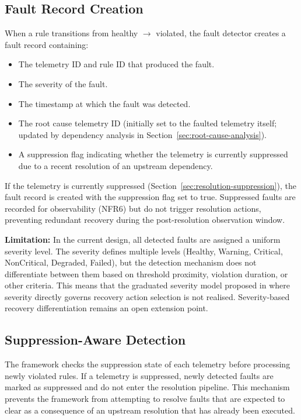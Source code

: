 \subsection{Fault Record Creation}\label{sec:fault-record-creation}

When a rule transitions from healthy $\rightarrow$ violated, the fault detector creates a fault record containing:

\begin{itemize}
\item The telemetry ID and rule ID that produced the fault.
\item The severity of the fault.
\item The timestamp at which the fault was detected.
\item The root cause telemetry ID (initially set to the faulted telemetry itself; updated by dependency analysis in Section~\ref{sec:root-cause-analysis}).
\item A suppression flag indicating whether the telemetry is currently suppressed due to a recent resolution of an upstream dependency.
\end{itemize}

If the telemetry is currently suppressed (Section~\ref{sec:resolution-suppression}), the fault record is created with the suppression flag set to true. Suppressed faults are recorded for observability (NFR6) but do not trigger resolution actions, preventing redundant recovery during the post-resolution observation window.

\textbf{Limitation:} In the current design, all detected faults are assigned a uniform severity level. The severity defines multiple levels (Healthy, Warning, Critical, NonCritical, Degraded, Failed), but the detection mechanism does not differentiate between them based on threshold proximity, violation duration, or other criteria. This means that the graduated severity model proposed in \cite{ref1} where severity directly governs recovery action selection is not realised. Severity-based recovery differentiation remains an open extension point.

\subsection{Suppression-Aware Detection}\label{sec:suppression-aware-detection}

The framework checks the suppression state of each telemetry before processing newly violated rules. If a telemetry is suppressed, newly detected faults are marked as suppressed and do not enter the resolution pipeline. This mechanism prevents the framework from attempting to resolve faults that are expected to clear as a consequence of an upstream resolution that has already been executed.

